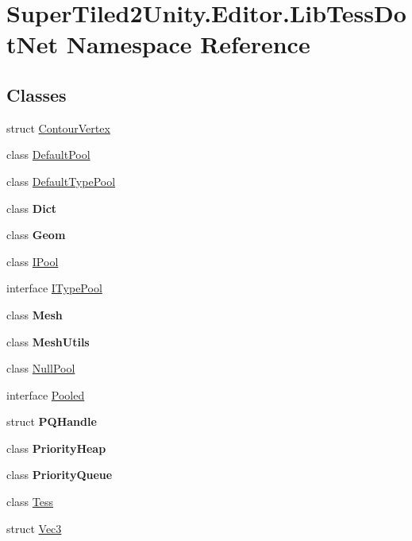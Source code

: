 \hypertarget{namespace_super_tiled2_unity_1_1_editor_1_1_lib_tess_dot_net}{}\section{Super\+Tiled2\+Unity.\+Editor.\+Lib\+Tess\+Dot\+Net Namespace Reference}
\label{namespace_super_tiled2_unity_1_1_editor_1_1_lib_tess_dot_net}
\subsection*{Classes}
\begin{DoxyCompactItemize}
\item 
struct \mbox{\hyperlink{struct_super_tiled2_unity_1_1_editor_1_1_lib_tess_dot_net_1_1_contour_vertex}{Contour\+Vertex}}
\item 
class \mbox{\hyperlink{class_super_tiled2_unity_1_1_editor_1_1_lib_tess_dot_net_1_1_default_pool}{Default\+Pool}}
\item 
class \mbox{\hyperlink{class_super_tiled2_unity_1_1_editor_1_1_lib_tess_dot_net_1_1_default_type_pool}{Default\+Type\+Pool}}
\item 
class {\bfseries Dict}
\item 
class {\bfseries Geom}
\item 
class \mbox{\hyperlink{class_super_tiled2_unity_1_1_editor_1_1_lib_tess_dot_net_1_1_i_pool}{I\+Pool}}
\item 
interface \mbox{\hyperlink{interface_super_tiled2_unity_1_1_editor_1_1_lib_tess_dot_net_1_1_i_type_pool}{I\+Type\+Pool}}
\item 
class {\bfseries Mesh}
\item 
class {\bfseries Mesh\+Utils}
\item 
class \mbox{\hyperlink{class_super_tiled2_unity_1_1_editor_1_1_lib_tess_dot_net_1_1_null_pool}{Null\+Pool}}
\item 
interface \mbox{\hyperlink{interface_super_tiled2_unity_1_1_editor_1_1_lib_tess_dot_net_1_1_pooled}{Pooled}}
\item 
struct {\bfseries P\+Q\+Handle}
\item 
class {\bfseries Priority\+Heap}
\item 
class {\bfseries Priority\+Queue}
\item 
class \mbox{\hyperlink{class_super_tiled2_unity_1_1_editor_1_1_lib_tess_dot_net_1_1_tess}{Tess}}
\item 
struct \mbox{\hyperlink{struct_super_tiled2_unity_1_1_editor_1_1_lib_tess_dot_net_1_1_vec3}{Vec3}}
\end{DoxyCompactItemize}
